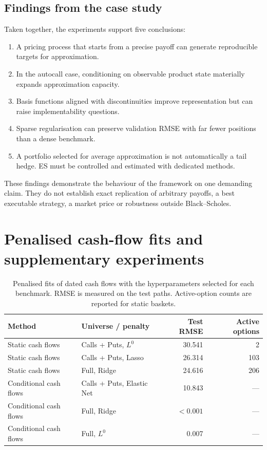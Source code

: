 \subsection{Findings from the case study}

Taken together, the experiments support five conclusions:

\begin{enumerate}
\item A pricing process that starts from a precise payoff can generate
reproducible targets for approximation.
\item In the autocall case, conditioning on observable product state materially
expands approximation capacity.
\item Basis functions aligned with discontinuities improve representation but
can raise implementability questions.
\item Sparse regularisation can preserve validation RMSE with far fewer
positions than a dense benchmark.
\item A portfolio selected for average approximation is not automatically a
tail hedge. ES must be controlled and estimated with dedicated methods.
\end{enumerate}

These findings demonstrate the behaviour of the framework on one demanding
claim. They do not establish exact replication of arbitrary payoffs, a best
executable strategy, a market price or robustness outside Black--Scholes.


\section{Penalised cash-flow fits and supplementary experiments}\label{app:capacity-supplement}

\begin{table}[htbp]
\centering
\small
\begin{tabular}{llrr}
\toprule
Method & Universe / penalty & Test RMSE & Active options \\
\midrule
Static cash flows & Calls + Puts, $L^0$ & 30.541 & 2 \\
Static cash flows & Calls + Puts, Lasso & 26.314 & 103 \\
Static cash flows & Full, Ridge & 24.616 & 206 \\
Conditional cash flows & Calls + Puts, Elastic Net & 10.843 & --- \\
Conditional cash flows & Full, Ridge & $<0.001$ & --- \\
Conditional cash flows & Full, $L^0$ & 0.007 & --- \\
\bottomrule
\end{tabular}
\caption{Penalised fits of dated cash flows with the hyperparameters selected for each benchmark. RMSE is measured on the test paths. Active-option counts are reported for static baskets.}
\label{tab:capacity}
\end{table}

